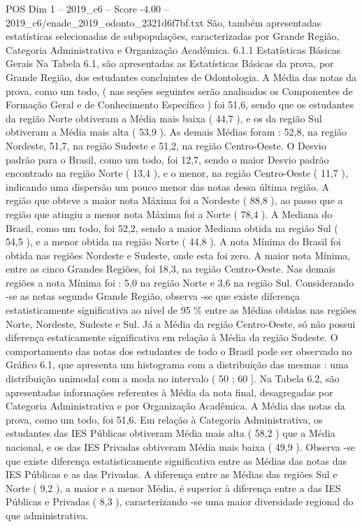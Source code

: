 \begin{textsample}{POS Dim 1 – 2019\_c6 – Score -4.00 – 2019\_c6/enade\_2019\_odonto\_2321d6f7bf.txt}
São, também apresentadas estatísticas selecionadas de subpopulações, caracterizadas por Grande Região, Categoria Administrativa e Organização Acadêmica. 6.1.1 Estatísticas Básicas Gerais Na Tabela 6.1, são apresentadas as Estatísticas Básicas da prova, por Grande Região, dos estudantes concluintes de Odontologia.
A Média das notas da prova, como um todo, ( nas seções seguintes serão analisados os Componentes de Formação Geral e de Conhecimento Específico ) foi 51,6, sendo que os estudantes da região Norte obtiveram a Média mais baixa ( 44,7 ), e os da região Sul obtiveram a Média mais alta ( 53,9 ).
As demais Médias foram : 52,8, na região Nordeste, 51,7, na região Sudeste e 51,2, na região Centro-Oeste.
O Desvio padrão para o Brasil, como um todo, foi 12,7, sendo o maior Desvio padrão encontrado na região Norte ( 13,4 ), e o menor, na região Centro-Oeste ( 11,7 ), indicando uma dispersão um pouco menor das notas dessa última região.
A região que obteve a maior nota Máxima foi a Nordeste ( 88,8 ), ao passo que a região que atingiu a menor nota Máxima foi a Norte ( 78,4 ).
A Mediana do Brasil, como um todo, foi 52,2, sendo a maior Mediana obtida na região Sul ( 54,5 ), e a menor obtida na região Norte ( 44,8 ).
A nota Mínima do Brasil foi obtida nas regiões Nordeste e Sudeste, onde esta foi zero.
A maior nota Mínima, entre as cinco Grandes Regiões, foi 18,3, na região Centro-Oeste.
Nas demais regiões a nota Mínima foi : 5,0 na região Norte e 3,6 na região Sul.
Considerando -se as notas segundo Grande Região, observa -se que existe diferença estatisticamente significativa ao nível de 95 \% entre as Médias obtidas nas regiões Norte, Nordeste, Sudeste e Sul.
Já a Média da região Centro-Oeste, só não possui diferença estaticamente significativa em relação à Média da região Sudeste.
O comportamento das notas dos estudantes de todo o Brasil pode ser observado no Gráfico 6.1, que apresenta um histograma com a distribuição das mesmas : uma distribuição unimodal com a moda no intervalo ( 50 ; 60 ].
Na Tabela 6.2, são apresentadas informações referentes à Média da nota final, desagregadas por Categoria Administrativa e por Organização Acadêmica.
A Média das notas da prova, como um todo, foi 51,6.
Em relação à Categoria Administrativa, os estudantes das IES Públicas obtiveram Média mais alta ( 58,2 ) que a Média nacional, e os das IES Privadas obtiveram Média mais baixa ( 49,9 ).
Observa -se que existe diferença estatisticamente significativa entre as Médias das notas das IES Públicas e as das Privadas.
A diferença entre as Médias das regiões Sul e Norte ( 9,2 ), a maior e a menor Média, é superior à diferença entre a das IES Públicas e Privadas ( 8,3 ), caracterizando -se uma maior diversidade regional do que administrativa.

\end{textsample}
